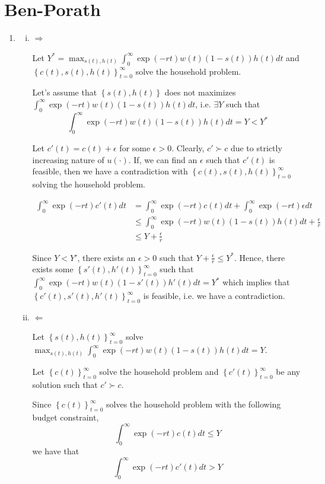 \documentclass[12pt]{article}
\newcommand{\1}{{\bf 1}} %
\newcommand{\cbra}[1]{\left\{ #1 \right\}}
\begin{document}
\section*{Ben-Porath}
\begin{enumerate}[(1)]
	\item 
	
	\begin{enumerate}[(i)]
		\item $\Rightarrow$
		
		Let $Y^*=\max_{s(t),h(t)}\int_{0}^{\infty}\exp(-rt)w(t)(1-s(t))h(t)dt$ and $\cbra{c(t),s(t),h(t)}_{t=0}^\infty$ solve the household problem.
		
		Let's assume that $\cbra{s(t),h(t)}$ does not maximizes $\int_{0}^{\infty}\exp(-rt)w(t)(1-s(t))h(t)dt$, i.e. $\exists Y$ such that
		\[
		\int_{0}^{\infty}\exp(-rt)w(t)(1-s(t))h(t)dt = Y < Y^*
		\]
		
		Let $c'(t)=c(t)+\epsilon$ for some $\epsilon>0$. Clearly, $c' \succ c$ due to strictly increasing nature of $u(\cdot)$. If, we can find an $\epsilon$ such that $c'(t)$ is feasible, then we have a contradiction with $\cbra{c(t),s(t),h(t)}_{t=0}^\infty$ solving the household problem.
		
		\begin{align*}
			\int_{0}^{\infty}\exp(-rt)c'(t)dt & = \int_{0}^{\infty}\exp(-rt)c(t)dt + \int_{0}^{\infty}\exp(-rt)\epsilon dt\\
			& \leq \int_{0}^{\infty}\exp(-rt)w(t)(1-s(t))h(t)dt + \frac{\epsilon}{r}\\
			& \leq Y + \frac{\epsilon}{r}
		\end{align*}
		
		Since $Y<Y'$, there exists an $\epsilon>0$ such that $Y + \frac{\epsilon}{r}\leq Y^*$. Hence, there exists some $\cbra{s'(t),h'(t)}_{t=0}^\infty$ such that $\int_{0}^{\infty}\exp(-rt)w(t)(1-s'(t))h'(t)dt=Y^*$ which implies that $\cbra{c'(t),s'(t),h'(t)}_{t=0}^\infty$ is feasible, i.e. we have a contradiction.
		
		\item $\Leftarrow$
		
		Let $\cbra{s(t),h(t)}_{t=0}^\infty$ solve $\max_{s(t),h(t)}\int_{0}^{\infty}\exp(-rt)w(t)(1-s(t))h(t)dt = Y$.
		
		Let $\cbra{c(t)}_{t=0}^\infty$ solve the household problem and $\cbra{c'(t)}_{t=0}^\infty$ be any solution such that $c'\succ c$. 
		
		Since $\cbra{c(t)}_{t=0}^\infty$ solves the household problem with the following budget constraint,
		\[
		\int_{0}^{\infty}\exp(-rt)c(t)dt \leq Y
		\]
		we have that 
		\[
		\int_{0}^{\infty}\exp(-rt)c'(t)dt > Y
		\]
		

\end{enumerate}
\end{enumerate}
\end{document}
